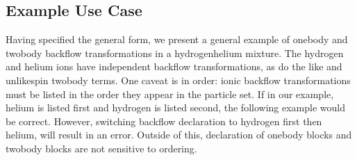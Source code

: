 \documentclass[letterpaper,10pt,english]{sphinxmanual}
\begin{document}
\subsection{Example Use Case}
\label{\detokenize{intro_wavefunction:id24}}
Having specified the general form, we present a general example of one\sphinxhyphen{}body and two\sphinxhyphen{}body backflow transformations in a hydrogen\sphinxhyphen{}helium mixture.  The hydrogen and helium ions have independent backflow transformations, as do the like and unlike\sphinxhyphen{}spin two\sphinxhyphen{}body terms.  One caveat is in order:  ionic backflow transformations must be listed in the order they appear in the particle set.  If in our example, helium is listed first and hydrogen is listed second, the following example would be correct.  However, switching backflow declaration to hydrogen first then helium, will result in an error.  Outside of this, declaration of one\sphinxhyphen{}body blocks and two\sphinxhyphen{}body blocks are not sensitive to ordering.
\end{document}

